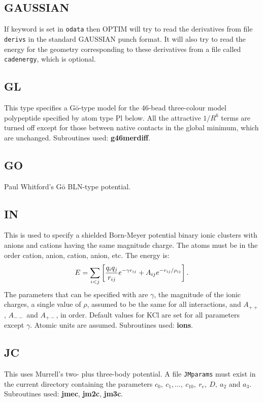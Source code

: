 {{{\subsection{GAUSSIAN}If keyword {} is set in {\tt odata} then
OPTIM will try to read the derivatives from file {\tt derivs} in the
standard GAUSSIAN punch format.
It will also try to read the energy for the geometry
corresponding to these derivatives from a file called {\tt cadenergy}, which is optional.

\subsection{GL}This type specifies a G\={o}-type model\cite{uedatg78} for the
46-bead three-colour model polypeptide specified by atom type Pl below. 
All the attractive $1/R^6$ terms are turned off except for those between
native contacts in the global minimum, which are unchanged.
Subroutines used: {\bf g46merdiff}.

\subsection{GO}Paul Whitford's G\={o} BLN-type potential.

\subsection{IN}This is used to specify a shielded Born-Meyer potential binary ionic clusters with
anions and cations having the same magnitude charge.
The atoms must be in the order cation, anion, cation, anion, etc. The energy is:
$$ E = \sum_{i<j} \left[ {q_iq_j\over r_{ij}} e^{-\gamma r_{ij}} + A_{ij}e^{-r_{ij}/\rho_{ij}} \right]. $$
The parameters that can
be specified with {} are $\gamma$, the magnitude of the ionic charges, a single
value of $\rho$, assumed to be the same for all interactions, and $A_{++}$, $A_{--}$ and
$A_{+-}$, in order. Default values for KCl are set for all parameters except $\gamma$.
Atomic units are assumed. Subroutines used: {\bf ions}.

\subsection{JC}This uses Murrell's two- plus three-body 
potential.\cite{murrellm90,murrellr90,alderzijmr91,eggenjlm92,fengjm93} 
A file {\tt JMparams} must
exist in the current directory containing the parameters $c_0,\ c_1,\ldots,\ c_{10},\ r_e,\ 
D,\ a_2$ and $a_3$. Subroutines used: {\bf jmec}, {\bf jm2c}, {\bf jm3c}.

}}}
